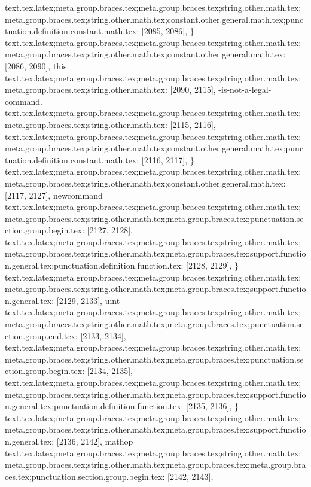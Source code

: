 {{{{{{{{{{{{{{{{{{{{{{{{{{{{{{{{{{{{{{{{{{{{{{{{{{text.tex.latex;meta.group.braces.tex;meta.group.braces.tex;string.other.math.tex;meta.group.braces.tex;string.other.math.tex;constant.other.general.math.tex;punctuation.definition.constant.math.tex: [2085, 2086], {\}
text.tex.latex;meta.group.braces.tex;meta.group.braces.tex;string.other.math.tex;meta.group.braces.tex;string.other.math.tex;constant.other.general.math.tex: [2086, 2090], {this}
text.tex.latex;meta.group.braces.tex;meta.group.braces.tex;string.other.math.tex;meta.group.braces.tex;string.other.math.tex: [2090, 2115], {-is-not-a-legal-command.
}
text.tex.latex;meta.group.braces.tex;meta.group.braces.tex;string.other.math.tex;meta.group.braces.tex;string.other.math.tex: [2115, 2116], {
}
text.tex.latex;meta.group.braces.tex;meta.group.braces.tex;string.other.math.tex;meta.group.braces.tex;string.other.math.tex;constant.other.general.math.tex;punctuation.definition.constant.math.tex: [2116, 2117], {\}
text.tex.latex;meta.group.braces.tex;meta.group.braces.tex;string.other.math.tex;meta.group.braces.tex;string.other.math.tex;constant.other.general.math.tex: [2117, 2127], {newcommand}
text.tex.latex;meta.group.braces.tex;meta.group.braces.tex;string.other.math.tex;meta.group.braces.tex;string.other.math.tex;meta.group.braces.tex;punctuation.section.group.begin.tex: [2127, 2128], {{}
text.tex.latex;meta.group.braces.tex;meta.group.braces.tex;string.other.math.tex;meta.group.braces.tex;string.other.math.tex;meta.group.braces.tex;support.function.general.tex;punctuation.definition.function.tex: [2128, 2129], {\}
text.tex.latex;meta.group.braces.tex;meta.group.braces.tex;string.other.math.tex;meta.group.braces.tex;string.other.math.tex;meta.group.braces.tex;support.function.general.tex: [2129, 2133], {uint}
text.tex.latex;meta.group.braces.tex;meta.group.braces.tex;string.other.math.tex;meta.group.braces.tex;string.other.math.tex;meta.group.braces.tex;punctuation.section.group.end.tex: [2133, 2134], {}}
text.tex.latex;meta.group.braces.tex;meta.group.braces.tex;string.other.math.tex;meta.group.braces.tex;string.other.math.tex;meta.group.braces.tex;punctuation.section.group.begin.tex: [2134, 2135], {{}
text.tex.latex;meta.group.braces.tex;meta.group.braces.tex;string.other.math.tex;meta.group.braces.tex;string.other.math.tex;meta.group.braces.tex;support.function.general.tex;punctuation.definition.function.tex: [2135, 2136], {\}
text.tex.latex;meta.group.braces.tex;meta.group.braces.tex;string.other.math.tex;meta.group.braces.tex;string.other.math.tex;meta.group.braces.tex;support.function.general.tex: [2136, 2142], {mathop}
text.tex.latex;meta.group.braces.tex;meta.group.braces.tex;string.other.math.tex;meta.group.braces.tex;string.other.math.tex;meta.group.braces.tex;meta.group.braces.tex;punctuation.section.group.begin.tex: [2142, 2143], {{}
}}}}}}}}}}}}}}}}}}}}}}}}}}}}}}}}}}}}}}}}}}}}}}}}}}}}}}}}
